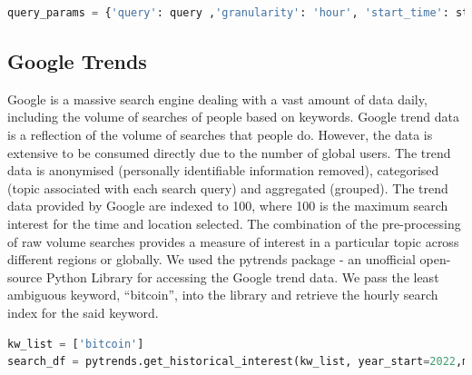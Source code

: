 \begin{lstlisting}[language=Python, caption= {Tweepy query to get tweet count withing each hour between predefined start time and end time}, label= tweet_count]
    query_params = {'query': query ,'granularity': 'hour', 'start_time': start_time, 'end_time': end_time}
\end{lstlisting}
\subsection*{Google Trends}
Google is a massive search engine dealing with a vast amount of data daily, including the volume of searches of people based on keywords. Google trend data is a reflection of the volume of searches that people do. However, the data is extensive to be consumed directly due to the number of global users. The trend data is anonymised (personally identifiable information removed), categorised (topic associated with each search query) and aggregated (grouped). The trend data provided by Google are indexed to 100, where 100 is the maximum search interest for the time and location selected. The combination of the pre-processing of raw volume searches provides a measure of interest in a particular topic across different regions or globally.
We used the pytrends package - an unofficial open-source Python Library for accessing the Google trend data. We pass the least ambiguous keyword, “bitcoin”, into the library and retrieve the hourly search index for the said keyword.

\begin{lstlisting}[language=Python, caption= {pytrend query to get google trend index withing each hour between predefined start time and end time}, label = pytrend_search]
kw_list = ['bitcoin']
search_df = pytrends.get_historical_interest(kw_list, year_start=2022,month_start=6, day_start=1, hour_start=0, year_end=2022,month_end=7, day_end=16, hour_end=0,cat=0, geo='', gprop='')
\end{lstlisting}


